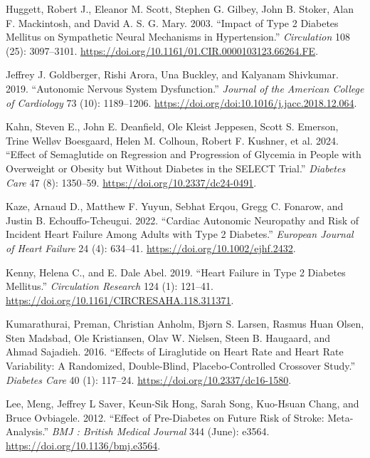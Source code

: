 \documentclass[
  a4paper,
  headsepline=true,
  open=any]{scrbook}
\newlength{\cslhangindent}
\newlength{\cslentryspacingunit} %
\newenvironment{CSLReferences}[2] %
 {%
  \setlength{\parindent}{0pt}
  \ifodd #1
  \let\oldpar\par
  \def\par{\hangindent=\cslhangindent\oldpar}
  \fi
  \setlength{\parskip}{#2\cslentryspacingunit}
 }%
 {}
\begin{document}
\begin{CSLReferences}{1}{0}
\leavevmode{}%
Huggett, Robert J., Eleanor M. Scott, Stephen G. Gilbey, John B. Stoker,
Alan F. Mackintosh, and David A. S. G. Mary. 2003. {``Impact of Type 2
Diabetes Mellitus on Sympathetic Neural Mechanisms in Hypertension.''}
\emph{Circulation} 108 (25): 3097--3101.
\url{https://doi.org/10.1161/01.CIR.0000103123.66264.FE}.

\leavevmode{}%
Jeffrey J. Goldberger, Rishi Arora, Una Buckley, and Kalyanam Shivkumar.
2019. {``Autonomic Nervous System Dysfunction.''} \emph{Journal of the
American College of Cardiology} 73 (10): 1189--1206.
\url{https://doi.org/doi:10.1016/j.jacc.2018.12.064}.

\leavevmode{}%
Kahn, Steven E., John E. Deanfield, Ole Kleist Jeppesen, Scott S.
Emerson, Trine Welløv Boesgaard, Helen M. Colhoun, Robert F. Kushner, et
al. 2024. {``Effect of Semaglutide on Regression and Progression of
Glycemia in People with Overweight or Obesity but Without Diabetes in
the SELECT Trial.''} \emph{Diabetes Care} 47 (8): 1350--59.
\url{https://doi.org/10.2337/dc24-0491}.

\leavevmode{}%
Kaze, Arnaud D., Matthew F. Yuyun, Sebhat Erqou, Gregg C. Fonarow, and
Justin B. Echouffo-Tcheugui. 2022. {``Cardiac Autonomic Neuropathy and
Risk of Incident Heart Failure Among Adults with Type 2 Diabetes.''}
\emph{European Journal of Heart Failure} 24 (4): 634--41.
\url{https://doi.org/10.1002/ejhf.2432}.

\leavevmode{}%
Kenny, Helena C., and E. Dale Abel. 2019. {``Heart Failure in Type 2
Diabetes Mellitus.''} \emph{Circulation Research} 124 (1): 121--41.
\url{https://doi.org/10.1161/CIRCRESAHA.118.311371}.

\leavevmode{}%
Kumarathurai, Preman, Christian Anholm, Bjørn S. Larsen, Rasmus Huan
Olsen, Sten Madsbad, Ole Kristiansen, Olav W. Nielsen, Steen B.
Haugaard, and Ahmad Sajadieh. 2016. {``Effects of Liraglutide on Heart
Rate and Heart Rate Variability: A Randomized, Double-Blind,
Placebo-Controlled Crossover Study.''} \emph{Diabetes Care} 40 (1):
117--24. \url{https://doi.org/10.2337/dc16-1580}.

\leavevmode{}%
Lee, Meng, Jeffrey L Saver, Keun-Sik Hong, Sarah Song, Kuo-Hsuan Chang,
and Bruce Ovbiagele. 2012. {``Effect of Pre-Diabetes on Future Risk of
Stroke: Meta-Analysis.''} \emph{BMJ : British Medical Journal} 344
(June): e3564. \url{https://doi.org/10.1136/bmj.e3564}.


\end{CSLReferences}
\end{document}
